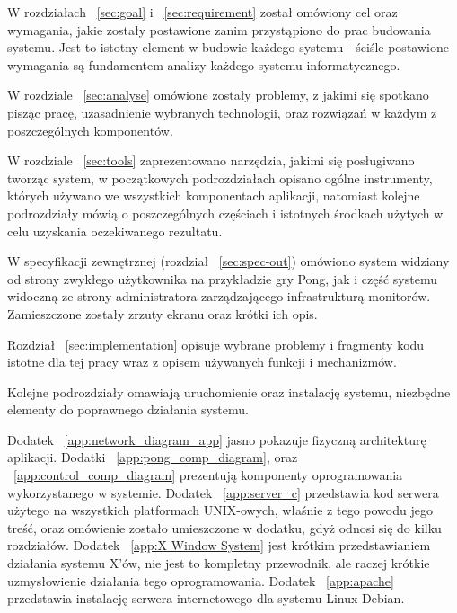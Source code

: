 W rozdziałach ~\ref{sec:goal} i ~\ref{sec:requirement} został omówiony cel oraz wymagania, jakie zostały postawione zanim przystąpiono do prac budowania systemu. Jest to istotny element w budowie każdego systemu - ściśle postawione wymagania są fundamentem analizy każdego systemu informatycznego.

\par
W rozdziale ~\ref{sec:analyse} omówione zostały problemy, z jakimi się spotkano pisząc pracę, uzasadnienie wybranych technologii, oraz rozwiązań w każdym z poszczególnych komponentów.

\par

W rozdziale ~\ref{sec:tools} zaprezentowano narzędzia, jakimi się posługiwano tworząc system, w początkowych podrozdziałach opisano ogólne instrumenty, których używano we wszystkich komponentach aplikacji, natomiast kolejne podrozdziały mówią o poszczególnych częściach i istotnych środkach użytych w celu uzyskania oczekiwanego rezultatu.

\par

W specyfikacji zewnętrznej (rozdział  ~\ref{sec:spec-out}) omówiono system widziany od strony zwykłego użytkownika na przykładzie gry Pong, jak i część systemu widoczną ze strony administratora zarządzającego infrastrukturą monitorów. Zamieszczone zostały zrzuty ekranu oraz krótki ich opis.

\par

Rozdział ~\ref{sec:implementation} opisuje wybrane problemy i fragmenty kodu istotne dla tej pracy wraz z opisem używanych funkcji i mechanizmów.

\par

Kolejne podrozdziały omawiają uruchomienie oraz instalację systemu, niezbędne elementy do poprawnego działania systemu. 

\par

Dodatek ~\ref{app:network_diagram_app} jasno pokazuje fizyczną architekturę aplikacji.
Dodatki ~\ref{app:pong_comp_diagram}, oraz ~\ref{app:control_comp_diagram} prezentują komponenty oprogramowania wykorzystanego w systemie.
Dodatek ~\ref{app:server_c} przedstawia kod serwera użytego na wszystkich platformach UNIX-owych, właśnie z tego powodu jego treść, oraz omówienie zostało umieszczone w dodatku, gdyż odnosi się do kilku rozdziałów.
Dodatek ~\ref{app:X Window System} jest krótkim przedstawianiem działania systemu X'ów, nie jest to kompletny przewodnik, ale raczej krótkie uzmysłowienie działania tego oprogramowania.
Dodatek ~\ref{app:apache} przedstawia instalację serwera internetowego dla systemu Linux Debian. 

